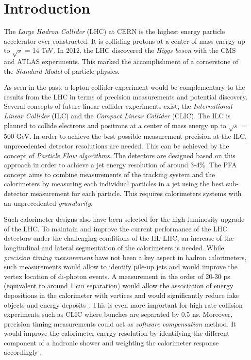 \chapter{Introduction}

The \textit{Large Hadron Collider} (LHC) at CERN is the highest energy particle accelerator ever constructed. It is colliding protons at a center of mass energy up to $\sqrt{s}$ = 14 TeV. In 2012, the LHC discovered the \textit{Higgs boson} with the CMS and ATLAS experiments. This marked the accomplishment of a cornerstone of the \textit{Standard Model} of particle physics.

As seen in the past, a lepton collider experiment would be complementary to the results from the LHC in terms of precision measurements and potential discovery. Several concepts of future linear collider experiments exist, the \textit{International Linear Collider} (ILC) and the \textit{Compact Linear Collider} (CLIC). The ILC is planned to collide electrons and positrons at a center of mass energy up to $\sqrt{s}$ = 500 GeV. In order to achieve the best possible measurement precision at the ILC, unprecedented detector resolutions are needed. This can be achieved by the concept of \textit{Particle Flow algorithms}. The detectors are designed based on this approach in order to achieve a jet energy resolution of around 3-4\%. The PFA concept aims to combine measurements of the tracking system and the calorimeters by measuring each individual particles in a jet using the best sub-detector measurement for each particle. This requires calorimeters systems with an unprecedented \textit{granularity}.

Such calorimeter designs also have been selected for the high luminosity upgrade of the LHC. To maintain and improve the current performance of the LHC detectors under the challenging conditions of the HL-LHC, an increase of the longitudinal and lateral segmentation of the calorimeters is needed. While \textit{precision timing measurement} have not been a key aspect in hadron calorimeters, such measurements would allow to identify pile-up jets and would improve the vertex location of di-photon events. A measurement in the order of 20-30 ps (equivalent to around 1 cm separation) would allow the association of energy depositions in the calorimeter with vertices and would significantly reduce fake objects and energy deposits \cite{CMSCollaboration:2015zni}. This is even more important for high rate collision experiments such as CLIC where bunches are separated by 0.5 ns. Moreover, precision timing measurements could act as \textit{software compensation} method. It would improve the calorimeter energy resolution by identifying the different component of a hadronic shower and weighting the calorimeter response accordingly \cite{Benaglia2016}.

